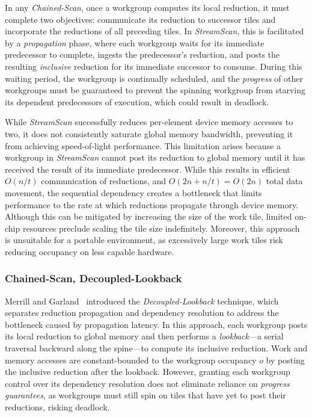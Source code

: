 \documentclass[sigconf]{acmart}
\begin{document}
In any \emph{Chained-Scan}, once a workgroup computes its local reduction, it must complete two objectives: communicate its reduction to successor tiles and incorporate the reductions of all preceding tiles. In \emph{StreamScan}, this is facilitated by a \emph{propagation} phase, where each workgroup waits for its immediate predecessor to complete, ingests the predecessor's reduction, and posts the resulting \emph{inclusive} reduction for its immediate successor to consume. During this waiting period, the workgroup is continually scheduled, and the \emph{progress} of other workgroups must be guaranteed to prevent the spinning workgroup from starving its dependent predecessors of execution, which could result in deadlock.

While \emph{StreamScan} successfully reduces per-element device memory accesses to two, it does not consistently saturate global memory bandwidth, preventing it from achieving speed-of-light performance. This limitation arises because a workgroup in \emph{StreamScan} cannot post its reduction to global memory until it has received the result of its immediate predecessor. While this results in efficient $O(n/t)$ communication of reductions, and $O(2n+ n/t)= O(2n)$ total data movement, the sequential dependency creates a bottleneck that limits performance to the rate at which reductions propagate through device memory. Although this can be mitigated by increasing the size of the work tile, limited on-chip resources preclude scaling the tile size indefinitely. Moreover, this approach is unsuitable for a portable environment, as excessively large work tiles risk reducing occupancy on less capable hardware.

\subsubsection{Chained-Scan, Decoupled-Lookback}
Merrill and Garland~\cite{Merrill2016} introduced the \emph{Decoupled-Lookback} technique, which separates reduction propagation and dependency resolution to address the bottleneck caused by propagation latency. In this approach, each workgroup posts its local reduction to global memory and then performs a \emph{lookback}---a serial traversal backward along the spine---to compute its inclusive reduction. Work and memory accesses are constant-bounded to the workgroup occupancy $o$ by posting the inclusive reduction after the lookback. However, granting each workgroup control over its dependency resolution does not eliminate reliance on \emph{progress guarantees}, as workgroups must still spin on tiles that have yet to post their reductions, risking deadlock.
\end{document}
